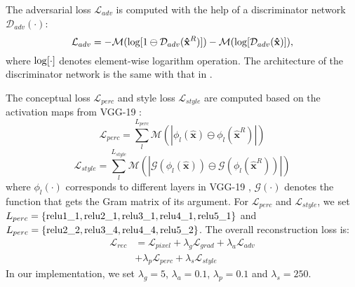 \documentclass[10pt,twocolumn,letterpaper]{article}
\begin{document}
The adversarial loss $\mathcal{L}_{adv}$ is computed with the help of a discriminator network $\mathcal{D}_{adv}(\cdot)$:
\begin{equation}
    \mathcal{L}_{adv} = - \mathcal{M}({\rm log}[1 \ominus \mathcal{D}_{adv}(\mathbf{\hat{x}}^R)]) - \mathcal{M}({\rm log}[\mathcal{D}_{adv}(\mathbf{\hat{x}})]),
	\label{eq: loss_adv}
\end{equation}
where ${\rm log}[\cdot]$ denotes element-wise logarithm operation. 
The architecture of the discriminator network is the same with that in \cite{nazeri2019edgeconnect}.

The conceptual loss $\mathcal{L}_{perc}$ and style loss $\mathcal{L}_{style}$ are computed based on the activation maps from VGG-19 \cite{simonyan2014very}:
\begin{equation}
    \mathcal{L}_{perc} = \sum\limits_{l}^{L_{perc}} \mathcal{M}(|\phi_{l}(\mathbf{\hat{x}}) \ominus \phi_{l}(\mathbf{\hat{x}}^R)|)
	\label{eq: loss_perc}
\end{equation}
\begin{equation}
    \mathcal{L}_{style} = \sum\limits_{l}^{L_{style}} \mathcal{M}(|\mathcal{G}(\phi_{l}(\mathbf{\hat{x}})) \ominus \mathcal{G}(\phi_{l}(\mathbf{\hat{x}}^R))|)
	\label{eq: loss_style}
\end{equation}
where $\phi_{l}(\cdot)$ corresponds to different layers in VGG-19 \cite{simonyan2014very}, $\mathcal{G}(\cdot)$ denotes the function that gets the Gram matrix of its argument. For $\mathcal{L}_{perc}$ and $\mathcal{L}_{style}$, we set $L_{perc}=\{{\rm relu1\_1}, {\rm relu2\_1}, {\rm relu3\_1}, {\rm relu4\_1}, {\rm relu5\_1}\}$ and  $L_{perc}=\{{\rm relu2\_2}, {\rm relu3\_4}, {\rm relu4\_4}, {\rm relu5\_2}\}$. The overall reconstruction loss is:
\begin{equation}
\begin{aligned}
    \mathcal{L}_{rec} & = \mathcal{L}_{pixel} + \lambda_{g} \mathcal{L}_{grad} + \lambda_{a} \mathcal{L}_{adv} \\
    & + \lambda_{p} \mathcal{L}_{perc} + \lambda_{s} \mathcal{L}_{style}
\end{aligned}
	\label{eq: loss_reconstruction}
\end{equation}
In our implementation, we set $\lambda_{g}=5$,  $\lambda_{a}=0.1$,  $\lambda_{p}=0.1$ and  $\lambda_{s}=250$.
\end{document}
